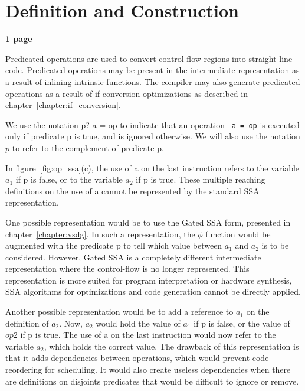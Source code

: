 \section{Definition and Construction}

\textbf{1 page}


Predicated operations are used to convert control-flow regions into
straight-line code. Predicated operations may be present in the intermediate
representation as a result of inlining intrinsic functions. The compiler may
also generate predicated operations as a result of if-conversion optimizations
as described in chapter~\ref{chapter:if_conversion}.

We use the notation {p? a = op} to indicate that an operation \texttt{
  a = op} is executed only if predicate {p} is true, and is
ignored otherwise. We will also use the notation $\overline{{p}}$
to refer to the complement of predicate {p}.

In figure~\ref{fig:op_ssa}(c), the use of {a} on the last
instruction refers to the variable ${a}_1$ if {p} is false, or
to the variable ${a}_2$ if {p} is true. These multiple
reaching definitions on the use of {a} cannot be represented by
the standard SSA representation.

One possible representation would be to use the Gated SSA form,
presented in chapter~\ref{chapter:vsdg}. In such a representation, the
$\phi$ function would be augmented with the predicate {p} to tell
which value between ${a}_1$ and ${a}_2$ is to be
considered. However, Gated SSA is a completely different intermediate
representation where the control-flow is no longer represented. This
representation is more suited for program interpretation or hardware
synthesis, SSA algorithms for optimizations and code generation cannot
be directly applied.

Another possible representation would be to add a reference to ${
  a_1}$ on the definition of ${a}_2$. Now, ${a}_2$ would hold
the value of ${a}_1$ if {p} is false, or the value of ${
  op2}$ if {p} is true. The use of {a} on the last instruction
would now refer to the variable ${a}_2$, which holds the correct
value. The drawback of this representation is that it adds
dependencies between operations, which would prevent code reordering
for scheduling. It would also create useless dependencies when there
are definitions on disjoints predicates that would be difficult to
ignore or remove.

